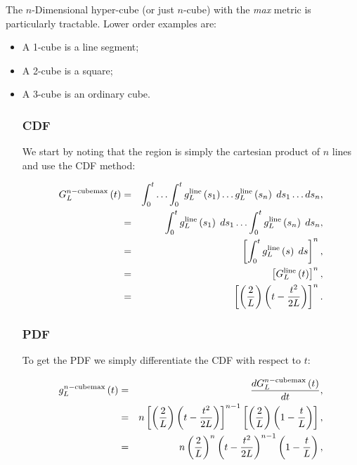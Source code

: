 The $n$-Dimensional hyper-cube (or just $n$-cube) with the {\em max} metric is particularly tractable.
Lower order examples are:
\begin{itemize}

\item A 1-cube is a line segment;

\item A 2-cube is a square;

\item A 3-cube is an ordinary cube.


\subsubsection{CDF}

We start by noting that the region is simply the cartesian product of $n$ lines and use the CDF method:

\begin{eqnarray}
 G^{n-{\rm cube max}}_L\left(t\right) & = & \int_{0}^{t} \ldots \int_{0}^{t}   g^{\rm line}_L\left(s_{1}\right)\ldots g^{\rm line}_L\left(s_{n}\right) \;ds_{1}\ldots ds_{n}, \nonumber \\
 & = & \int_{0}^{t}  g^{\rm line}_L\left(s_{1}\right) \;ds_{1}   \ldots \int_{0}^{t} g^{\rm line}_L\left(s_{n}\right) \;ds_{n},\nonumber \\
 & = & \left[\int_{0}^{t}  g^{\rm line}_L\left(s\right) \;ds \right]^{n},\nonumber \\
 & = & \left[G^{\rm line}_L\left(t\right)\right]^{n} ,\nonumber \\
 & = &  \left[\left(\frac{2}{L}\right)\left( t - \frac{t^2}{2L} \right)\right]^{n}.
\end{eqnarray}

\subsubsection{PDF}
To get the PDF we simply differentiate the CDF with respect to $t$:

\begin{eqnarray}
 g^{n-{\rm cube max}}_L\left(t\right) & = & \frac{d G^{n-{\rm cube max}}_L\left(t\right)}{dt},\nonumber \\
& = &  n\left[\left(\frac{2}{L}\right)\left( t - \frac{t^2}{2L} \right)\right]^{n-1} \left[\left(\frac{2}{L}\right)\left( 1 - \frac{t}{L} \right)\right],\nonumber \\
& = &  n\left(\frac{2}{L}\right)^{n} \left( t - \frac{t^2}{2L} \right)^{n-1}\left( 1 - \frac{t}{L} \right), \nonumber \\
\end{eqnarray} 
 

\end{itemize}
